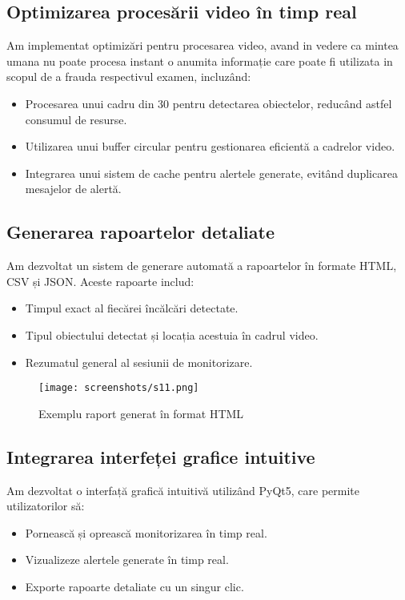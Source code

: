 \documentclass[12pt,a4paper]{article}
\begin{document}
\subsection{Optimizarea procesării video în timp real}
Am implementat optimizări pentru procesarea video, avand in vedere ca mintea umana nu poate procesa instant o anumita informație care poate fi utilizata in scopul de a frauda respectivul examen, incluzând:
\begin{itemize}
    \item Procesarea unui cadru din 30 pentru detectarea obiectelor, reducând astfel consumul de resurse.
    \item Utilizarea unui buffer circular pentru gestionarea eficientă a cadrelor video.
    \item Integrarea unui sistem de cache pentru alertele generate, evitând duplicarea mesajelor de alertă.
\end{itemize}

\subsection{Generarea rapoartelor detaliate}
Am dezvoltat un sistem de generare automată a rapoartelor în formate HTML, CSV și JSON. Aceste rapoarte includ:
\begin{itemize}
    \item Timpul exact al fiecărei încălcări detectate.
    \item Tipul obiectului detectat și locația acestuia în cadrul video.
    \item Rezumatul general al sesiunii de monitorizare.
\end{itemize}

\begin{figure}[H]
    \centering
    \texttt{[image: screenshots/s11.png]}
    \caption{Exemplu raport generat în format HTML} 
\end{figure}

\subsection{Integrarea interfeței grafice intuitive}
Am dezvoltat o interfață grafică intuitivă utilizând PyQt5, care permite utilizatorilor să:
\begin{itemize}
    \item Pornească și oprească monitorizarea în timp real.
    \item Vizualizeze alertele generate în timp real.
    \item Exporte rapoarte detaliate cu un singur clic.
\end{itemize}
\end{document}
